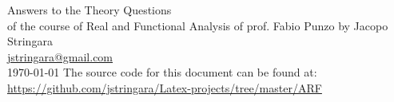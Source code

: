 \begin{titlepage}
    \begin{center}
        \vspace*{\fill}
        \Huge
        Answers to the Theory Questions \\
        \vspace{0.5em}
        \Large
        of the course of Real and Functional Analysis of prof. Fabio Punzo
        \vspace{0.5em}
        by Jacopo Stringara \\
        \vspace{-0.5em}
        \href{mailto:jstringara@gmail.com}{jstringara@gmail.com} \\
        \vspace{0.5em}
        \today
        \vfill
        The source code for this document can be found at:\\
        \href{https://github.com/jstringara/Latex-projects/tree/master/ARF}{https://github.com/jstringara/Latex-projects/tree/master/ARF}
    \end{center}
\end{titlepage}
